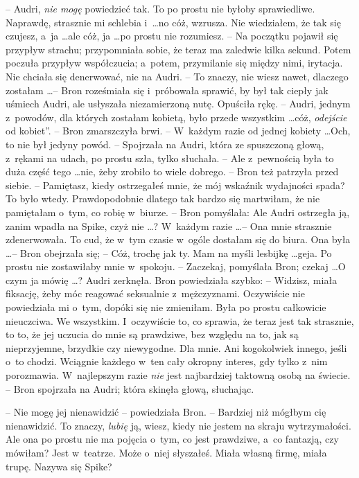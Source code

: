 \documentclass[oneside,polish,11pt,rmheadings]{mwbk}
\begin{document}
-- Audri, \textit{nie mogę }powiedzieć tak. To po prostu nie byłoby sprawiedliwe. Naprawdę, strasznie mi schlebia i~\ldots  no cóż, wzrusza. Nie wiedziałem, że tak się czujesz, a~ja \ldots  ale cóż, ja \ldots  po prostu nie rozumiesz. -- Na początku pojawił się przypływ strachu; przypomniała sobie, że teraz ma zaledwie kilka sekund. Potem poczuła przypływ współczucia; a~potem, przymilanie się między nimi, irytacja. Nie chciała się denerwować, nie na Audri. -- To znaczy, nie wiesz nawet, dlaczego zostałam \ldots  -- Bron roześmiała się i~próbowała sprawić, by był tak ciepły jak uśmiech Audri, ale usłyszała niezamierzoną nutę. Opuściła rękę. -- Audri, jednym z~powodów, dla których zostałam kobietą, było przede wszystkim \ldots  cóż, \textit{odejście }od kobiet''.  -- Bron zmarszczyła brwi. -- W~każdym razie od jednej kobiety \ldots  Och, to nie był jedyny powód. -- Spojrzała na Audri, która ze spuszczoną głową, z~rękami na udach, po prostu szła, tylko słuchała. -- Ale z~pewnością była to duża część tego \ldots  nie, żeby zrobiło to wiele dobrego. -- Bron też patrzyła przed siebie. -- Pamiętasz, kiedy ostrzegałeś mnie, że mój wskaźnik wydajności spada? To było wtedy. Prawdopodobnie dlatego tak bardzo się martwiłam, że nie pamiętałam o~tym, co robię w~biurze. -- Bron pomyślała: Ale Audri ostrzegła ją, zanim wpadła na Spike, czyż nie \ldots ? W~każdym razie \ldots  -- Ona mnie strasznie zdenerwowała. To cud, że w~tym czasie w~ogóle dostałam się do biura. Ona była \ldots  -- Bron obejrzała się; -- Cóż, trochę jak ty. Mam na myśli lesbijkę \ldots  geja. Po prostu nie zostawiłaby mnie w~spokoju. -- Zaczekaj, pomyślała Bron; czekaj  \ldots  O czym ja mówię  \ldots?  Audri zerknęła.  Bron powiedziała szybko: -- Widzisz, miała fiksację, żeby móc reagować seksualnie z~mężczyznami. Oczywiście nie powiedziała mi o~tym, dopóki się nie zmieniłam. Była po prostu całkowicie nieuczciwa. We wszystkim. I~oczywiście to, co sprawia, że teraz jest tak strasznie, to to, że jej uczucia do mnie są prawdziwe, bez względu na to, jak są nieprzyjemne, brzydkie czy niewygodne. Dla mnie. Ani kogokolwiek innego, jeśli o~to chodzi. Wciągnie każdego w~ten cały okropny interes, gdy tylko z~nim porozmawia. W~najlepszym razie \textit{nie }jest najbardziej taktowną osobą na świecie. -- Bron spojrzała na Audri; która skinęła głową, słuchając. 

-- Nie mogę jej nienawidzić -- powiedziała Bron. -- Bardziej niż mógłbym cię nienawidzić. To znaczy, \textit{lubię }ją, wiesz, kiedy nie jestem na skraju wytrzymałości. Ale ona po prostu nie ma pojęcia o~tym, co jest prawdziwe, a~co fantazją, czy mówiłam? Jest w~teatrze. Może o~niej słyszałeś. Miała własną firmę, miała trupę. Nazywa się Spike? 
\end{document}
